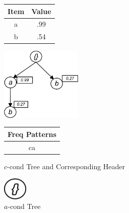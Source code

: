 \begin{figure}
\begin{minipage}{0.30\textwidth}
  \centering
	\begin{center}
	\begin{tabular}{ |c|c| } 
 	\hline
 		Item&Value\\ \hline\hline
 		a &  .99  	\\ \hline
 		b &  .54   	\\ \hline
\end{tabular}
\end{center}  
\end{minipage}
  \hfill
\begin{minipage}{0.29\textwidth}
  \centering
  \hfill
  \includegraphics[width=.8\textwidth, height=3.5cm]{images/C_COND.jpg}
  \hfill  
\end{minipage}
\hfill
\begin{minipage}{0.30\textwidth}
  \centering  
	\begin{center}
	\begin{tabular}{ |c| } 
 	\hline
 		Freq Patterns \\ \hline\hline
 		ca  	\\ \hline
 		
\end{tabular}
\end{center}   
\end{minipage}
\caption{$c$-cond Tree and Corresponding Header}
\label{figure:c_cond}
\end{figure}
\begin{figure}
\centering
  \includegraphics[width=.10\textwidth, height=1.1cm]{images/A_COND.jpg}
\caption{$a$-cond Tree}
\label{figure:a_cond}
\end{figure}

%

